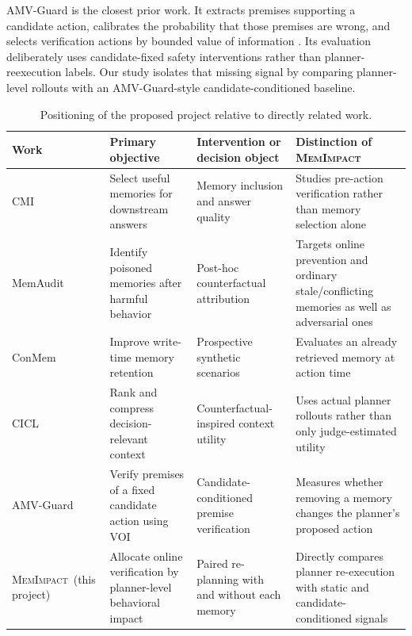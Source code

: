 \documentclass[11pt]{article}
\newcommand{\method}{\textsc{MemImpact}}
\begin{document}
AMV-Guard is the closest prior work. It extracts premises supporting a candidate action, calibrates the probability that those premises are wrong, and selects verification actions by bounded value of information \cite{wang2026amv}. Its evaluation deliberately uses candidate-fixed safety interventions rather than planner-reexecution labels. Our study isolates that missing signal by comparing planner-level rollouts with an AMV-Guard-style candidate-conditioned baseline.

\begin{table}[t]
\centering
\small
\caption{Positioning of the proposed project relative to directly related work.}
\label{tab:related}
\begin{tabularx}{\textwidth}{>{\raggedright\arraybackslash}p{} >{\raggedright\arraybackslash}p{} >{\raggedright\arraybackslash}p{} >{\raggedright\arraybackslash}X}
\toprule
\textbf{Work} & \textbf{Primary objective} & \textbf{Intervention or decision object} & \textbf{Distinction of \method} \\
\midrule
CMI \cite{srivastava2026cmi} & Select useful memories for downstream answers & Memory inclusion and answer quality & Studies pre-action verification rather than memory selection alone \\
MemAudit \cite{tan2026memaudit} & Identify poisoned memories after harmful behavior & Post-hoc counterfactual attribution & Targets online prevention and ordinary stale/conflicting memories as well as adversarial ones \\
ConMem \cite{zhang2026conmem} & Improve write-time memory retention & Prospective synthetic scenarios & Evaluates an already retrieved memory at action time \\
CICL \cite{guan2026cicl} & Rank and compress decision-relevant context & Counterfactual-inspired context utility & Uses actual planner rollouts rather than only judge-estimated utility \\
AMV-Guard \cite{wang2026amv} & Verify premises of a fixed candidate action using VOI & Candidate-conditioned premise verification & Measures whether removing a memory changes the planner's proposed action \\
\midrule
\method\ (this project) & Allocate online verification by planner-level behavioral impact & Paired re-planning with and without each memory & Directly compares planner re-execution with static and candidate-conditioned signals \\
\bottomrule
\end{tabularx}
\end{table}
\end{document}
